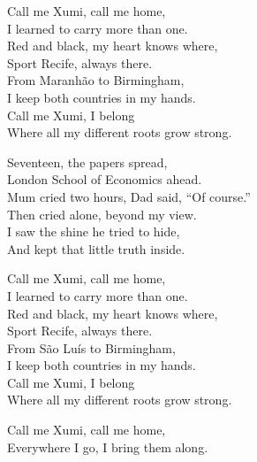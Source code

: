 \begin{lyrics}
Call me Xumi, call me home,\\
I learned to carry more than one.\\
Red and black, my heart knows where,\\
Sport Recife, always there.\\
From Maranhão to Birmingham,\\
I keep both countries in my hands.\\
Call me Xumi, I belong\\
Where all my different roots grow strong.

Seventeen, the papers spread,\\
London School of Economics ahead.\\
Mum cried two hours, Dad said, “Of course.”\\
Then cried alone, beyond my view.\\
I saw the shine he tried to hide,\\
And kept that little truth inside.

Call me Xumi, call me home,\\
I learned to carry more than one.\\
Red and black, my heart knows where,\\
Sport Recife, always there.\\
From São Luís to Birmingham,\\
I keep both countries in my hands.\\
Call me Xumi, I belong\\
Where all my different roots grow strong.

Call me Xumi, call me home,\\
Everywhere I go, I bring them along.
\end{lyrics}

